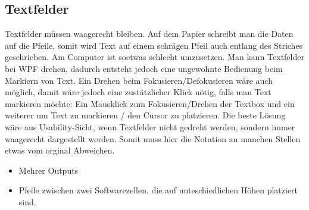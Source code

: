 \documentclass[11pt]{article}
\begin{document}
\subsection{Textfelder}
\label{sec:orgheadline23}
Textfelder müssen waagerecht bleiben. Auf dem Papier schreibt man die Daten auf
die Pfeile, somit wird Text auf einem schrägen Pfeil auch entlang des Striches
geschrieben.
Am Computer ist soetwas schlecht umzusetzen. Man kann Textfelder bei WPF drehen, dadurch
entsteht jedoch eine ungewohnte Bedienung beim Markiern von Text. Ein Drehen
beim Fokusieren/Defokusieren wäre auch möglich, damit wäre jedoch eine zustätzlicher
Klick nötig, falls man Text markieren möchte: Ein Mausklick zum Fokusieren/Drehen
der Textbox und ein weiterer um Text zu markieren / den Cursor zu platzieren.
Die beste Lösung wäre aus Usability-Sicht, wenn Textfelder nicht gedreht werden,
sondern immer waagerecht dargestellt werden. Somit muss hier die Notation an
manchen Stellen etwas vom orginal Abweichen.
\begin{itemize}
\item Mehrer Outputs
\item Pfeile zwischen zwei Softwarezellen, die auf unteschiedlichen Höhen platziert
sind.
\end{itemize}
\end{document}
